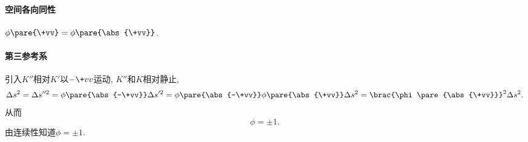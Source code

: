 \documentclass[hidelinks]{ctexart}
\begin{document}

\paragraph{空间各向同性} %
\label{par:空间各向同性}

$\phi\pare{\+vv} = \phi\pare{\abs{\+vv}}$.


\paragraph{第三参考系} %
\label{par:第三参考系}

引入$K''$相对$K'$以$-\+vv$运动, $K''$和$K$相对静止,
\[ \Delta s^2 = \Delta s''^2 = \phi\pare{\abs{-\+vv}}\Delta s'^2 = \phi\pare{\abs{-\+vv}}\phi\pare{\abs{\+vv}}\Delta s^2 = \brac{\phi\pare{\abs{\+vv}}}^2 \Delta s^2. \]
从而
\[ \phi = \pm 1. \]
由连续性知道$\phi = \pm 1$.

\end{document}
